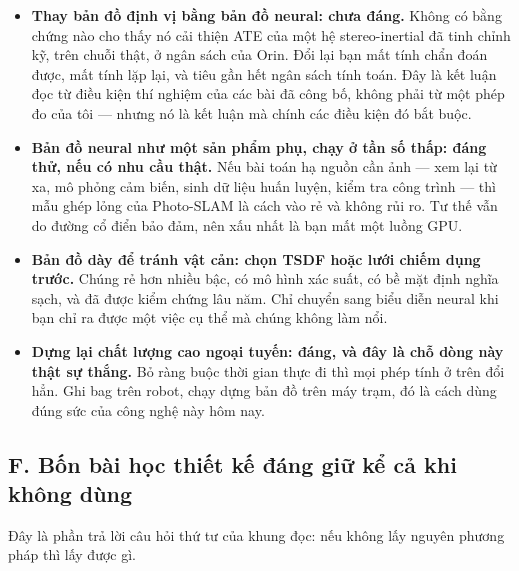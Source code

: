 \documentclass[../../deep_learning.tex]{subfiles}
\begin{document}
\begin{itemize}
\item \textbf{Thay bản đồ định vị bằng bản đồ neural: chưa đáng.} Không có bằng chứng nào cho thấy nó cải thiện ATE của một hệ stereo-inertial đã tinh chỉnh kỹ, trên chuỗi thật, ở ngân sách của Orin. Đổi lại bạn mất tính chẩn đoán được, mất tính lặp lại, và tiêu gần hết ngân sách tính toán. Đây là kết luận đọc từ điều kiện thí nghiệm của các bài đã công bố, không phải từ một phép đo của tôi --- nhưng nó là kết luận mà chính các điều kiện đó bắt buộc.
\item \textbf{Bản đồ neural như một sản phẩm phụ, chạy ở tần số thấp: đáng thử, nếu có nhu cầu thật.} Nếu bài toán hạ nguồn cần ảnh --- xem lại từ xa, mô phỏng cảm biến, sinh dữ liệu huấn luyện, kiểm tra công trình --- thì mẫu ghép lỏng của Photo-SLAM là cách vào rẻ và không rủi ro. Tư thế vẫn do đường cổ điển bảo đảm, nên xấu nhất là bạn mất một luồng GPU.
\item \textbf{Bản đồ dày để tránh vật cản: chọn TSDF hoặc lưới chiếm dụng trước.} Chúng rẻ hơn nhiều bậc, có mô hình xác suất, có bề mặt định nghĩa sạch, và đã được kiểm chứng lâu năm. Chỉ chuyển sang biểu diễn neural khi bạn chỉ ra được một việc cụ thể mà chúng không làm nổi.
\item \textbf{Dựng lại chất lượng cao ngoại tuyến: đáng, và đây là chỗ dòng này thật sự thắng.} Bỏ ràng buộc thời gian thực đi thì mọi phép tính ở trên đổi hẳn. Ghi bag trên robot, chạy dựng bản đồ trên máy trạm, đó là cách dùng đúng sức của công nghệ này hôm nay.
\end{itemize}

\subsection{F. Bốn bài học thiết kế đáng giữ kể cả khi không dùng}
Đây là phần trả lời câu hỏi thứ tư của khung đọc: nếu không lấy nguyên phương pháp thì lấy được gì.
\end{document}
